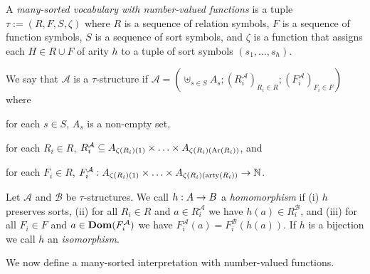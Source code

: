\documentclass[../main/thesis.tex]{subfiles}
\begin{document}
\begin{definition}
  A \emph{many-sorted vocabulary with number-valued functions} is a tuple $\tau
  := (R, F, S, \zeta)$ where $R$ is a sequence of relation symbols, $F$ is a
  sequence of function symbols, $S$ is a sequence of sort symbols, and $\zeta$
  is a function that assigns each $H \in R \cup F$ of arity $h$ to a tuple of
  sort symbols $(s_1, \ldots, s_h)$.

  We say that $\mathcal{A}$ is a $\tau$-structure if $\mathcal{A} = (\uplus_{s
    \in S} A_s; (R^{\mathcal{A}}_i)_{R_i \in R} ; (F^{\mathcal{A}}_i)_{F_i \in
    F})$ where
  \begin{myitemize}
  \item for each $s \in S$, $A_s$ is a non-empty set,
  \item for each $R_i \in R$, $R^{\mathcal{A}}_i \subseteq A_{\zeta(R_i)(1)}
    \times \ldots \times A_{\zeta(R_i)(\text{\upshape Ar}(R_i))}$, and
  \item for each $F_i \in R$, $F^{\mathcal{A}}_i : A_{\zeta(R_i)(1)} \times
    \ldots \times A_{\zeta(R_i)(\mathrm{arty}(R_i))} \rightarrow \mathbb{N}$.
  \end{myitemize}

  Let $\mathcal{A}$ and $\mathcal{B}$ be $\tau$-structures. We call $h : A \rightarrow
  B$ a \emph{homomorphism} if (i) $h$ preserves sorts, (ii) for all $R_i \in R$
  and $a \in R^{\mathcal{A}}_i$ we have $h(a) \in R^{\mathcal{B}}_i$, and (iii)
  for all $F_i \in F$ and $a \in \text{\textbf{Dom}} (F^{\mathcal{A}}_i)$ we have
  $F^{\mathcal{A}}_i(a) = F^{\mathcal{B}}_i(h(a))$. If $h$ is a bijection we
  call $h$ an \emph{isomorphism}.
\end{definition}


We now define a many-sorted interpretation with number-valued functions.
\end{document}
